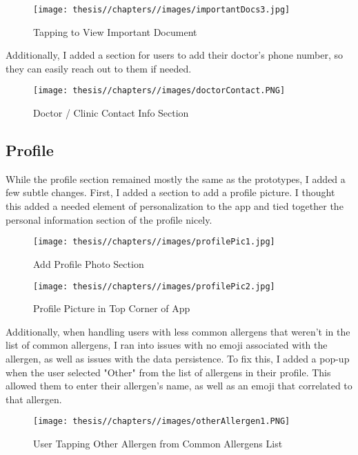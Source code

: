 \begin{figure} [H]
    \centering
    \texttt{[image: thesis//chapters//images/importantDocs3.jpg]}
    \caption{Tapping to View Important Document}
 
\end{figure}

Additionally, I added a section for users to add their doctor's phone number, so they can easily reach out to them if needed.

\begin{figure} [H]
    \centering
    \texttt{[image: thesis//chapters//images/doctorContact.PNG]}
    \caption{Doctor / Clinic Contact Info Section}
 
\end{figure}

\subsection{Profile}

While the profile section remained mostly the same as the prototypes, I added a few subtle changes. First, I added a section to add a profile picture. I thought this added a needed element of personalization to the app and tied together the personal information section of the profile nicely.

\begin{figure} [H]
    \centering
    \texttt{[image: thesis//chapters//images/profilePic1.jpg]}
    \caption{Add Profile Photo Section}
 
\end{figure}

\begin{figure} [H]
    \centering
    \texttt{[image: thesis//chapters//images/profilePic2.jpg]}
    \caption{Profile Picture in Top Corner of App}
 
\end{figure}

Additionally, when handling users with less common allergens that weren't in the list of common allergens, I ran into issues with no emoji associated with the allergen, as well as issues with the data persistence. To fix this, I added a pop-up when the user selected "Other" from the list of allergens in their profile. This allowed them to enter their allergen's name, as well as an emoji that correlated to that allergen.

\begin{figure} [H]
    \centering
    \texttt{[image: thesis//chapters//images/otherAllergen1.PNG]}
    \caption{User Tapping Other Allergen from Common Allergens List}
 
\end{figure}

